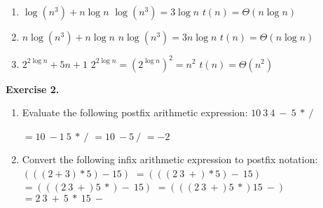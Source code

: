 \documentclass[12pt,letterpaper,final]{report}
\begin{document}
\begin{enumerate}
\item $\log(n^3) + n \log n$
\newline $ \log (n^3) = 3 \log n $
\newline $t(n) = \Theta(n \log n)$

\item $n \log (n^3) + n \log n$
\newline $ n \log (n^3) = 3n \log n $
\newline $t(n) = \Theta(n \log n)$

\item $2^{2 \log n} + 5n +1$
\newline $2^{2 \log n} = (2^{\log n})^2 = n^2$
\newline $t(n) = \Theta(n^{2})$

\end{enumerate}
\bigskip


\textbf{Exercise 2.}  
\begin{enumerate}
\item Evaluate the following postfix arithmetic expression:  $10~3~4~-~5~*~/$

\newline $ = 10~-1~5~*~/ $
\newline $ = 10~-5~/ $
\newline $ = -2 $



\item Convert the following infix arithmetic expression to postfix notation: $(((2+3)*5)-15)$
\newline 
\newline $= (((2~3~+)*5)-~15)$
\newline $= (((2~3~+) 5~*)-~15)$
\newline $= (((2~3~+) 5~*) 15~-)$
\newline $= 2~3~+~5~*~15~- $

\newline 

\end{enumerate}

\bigskip
\end{document}
